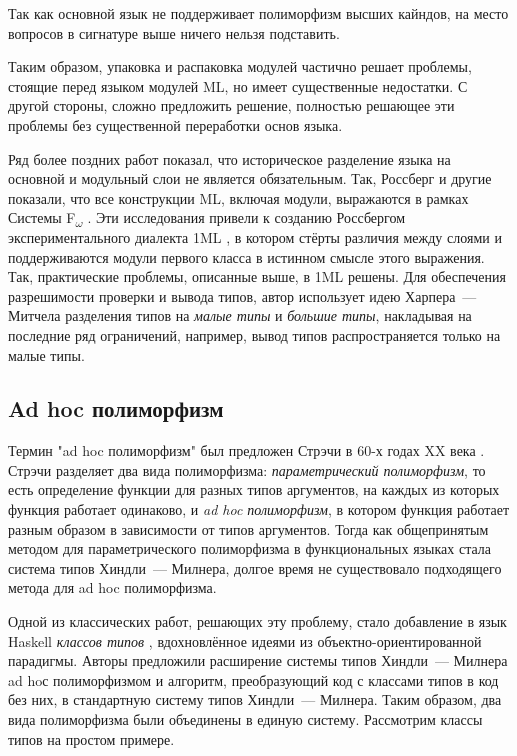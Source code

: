 \documentclass[../diploma.tex]{subfiles}
\begin{document}
Так как основной язык не поддерживает полиморфизм высших кайндов, на место вопросов в сигнатуре выше ничего нельзя подставить. 

Таким образом, упаковка и распаковка модулей частично решает проблемы, стоящие перед языком модулей ML, но имеет существенные недостатки. С другой стороны, сложно предложить решение, полностью решающее эти проблемы без существенной переработки основ языка.

Ряд более поздних работ показал, что историческое разделение языка на основной и модульный слои не является обязательным. Так, Россберг и другие показали, что все конструкции ML, включая модули, выражаются в рамках Системы F\textsubscript{$\omega$} \cite{fing}. Эти исследования привели к созданию Россбергом экспериментального диалекта 1ML \cite{1ml}, в котором стёрты различия между слоями и поддерживаются модули первого класса в истинном смысле этого выражения. Так, практические проблемы, описанные выше, в 1ML решены. Для обеспечения разрешимости проверки и вывода типов, автор использует идею Харпера~--- Митчела \cite{harper_mitchell} разделения типов на \textit{малые типы} и \textit{большие типы}, накладывая на последние ряд ограничений, например, вывод типов распространяется только на малые типы.  

\subsection{Ad hoc полиморфизм}

Термин "ad hoc полиморфизм" был предложен Стрэчи в 60-х годах XX века \cite{strachey}. Стрэчи разделяет два вида полиморфизма: \textit{параметрический полиморфизм}, то есть определение функции для разных типов аргументов, на каждых из которых функция работает одинаково, и \textit{ad hoc полиморфизм}, в котором функция работает разным образом в зависимости от типов аргументов. Тогда как общепринятым методом для параметрического полиморфизма в функциональных языках стала система типов Хиндли~--- Милнера, долгое время не существовало подходящего метода для ad hoc полиморфизма.

Одной из классических работ, решающих эту проблему, стало добавление в язык Haskell \textit{классов типов} \cite{adhoc}, вдохновлённое идеями из объектно-ориентированной парадигмы. Авторы предложили расширение системы типов Хиндли~--- Милнера ad hoс полиморфизмом и алгоритм, преобразующий код с классами типов в код без них, в стандартную систему типов Хиндли~--- Милнера. Таким образом, два вида полиморфизма были объединены в единую систему. Рассмотрим классы типов на простом примере.
\end{document}
